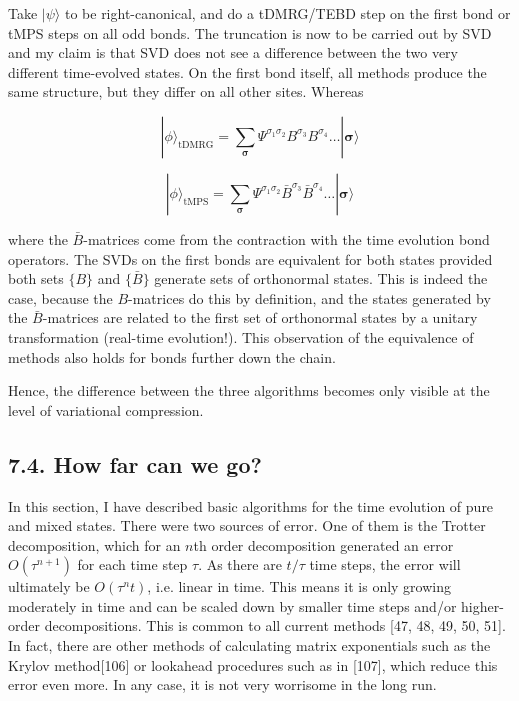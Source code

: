 \documentclass[12pt]{article}
\begin{document}
Take $|\psi\rangle$ to be right-canonical, and do a tDMRG/TEBD step on the first bond or tMPS steps on all odd bonds. The truncation is now to be carried out by SVD and my claim is that SVD does not see a difference between the two very different time-evolved states. On the first bond itself, all methods produce the same structure, but they differ on all other sites. Whereas


\begin{equation*}
|\phi\rangle_{\mathrm{tDMRG}}=\sum_{\boldsymbol{\sigma}} \Psi^{\sigma_{1} \sigma_{2}} B^{\sigma_{3}} B^{\sigma_{4}} \ldots|\boldsymbol{\sigma}\rangle \tag{275}
\end{equation*}



\begin{equation*}
|\phi\rangle_{\mathrm{tMPS}}=\sum_{\boldsymbol{\sigma}} \Psi^{\sigma_{1} \sigma_{2}} \bar{B}^{\sigma_{3}} \bar{B}^{\sigma_{4}} \ldots|\boldsymbol{\sigma}\rangle \tag{276}
\end{equation*}


where the $\bar{B}$-matrices come from the contraction with the time evolution bond operators. The SVDs on the first bonds are equivalent for both states provided both sets $\{B\}$ and $\{\bar{B}\}$ generate sets of orthonormal states. This is indeed the case, because the $B$-matrices do this by definition, and the states generated by the $\bar{B}$-matrices are related to the first set of orthonormal states by a unitary transformation (real-time evolution!). This observation of the equivalence of methods also holds for bonds further down the chain.

Hence, the difference between the three algorithms becomes only visible at the level of variational compression.

\subsection*{7.4. How far can we go?}
In this section, I have described basic algorithms for the time evolution of pure and mixed states. There were two sources of error. One of them is the Trotter decomposition, which for an $n$th order decomposition generated an error $O\left(\tau^{n+1}\right)$ for each time step $\tau$. As there are $t / \tau$ time steps, the error will ultimately be $O\left(\tau^{n} t\right)$, i.e. linear in time. This means it is only growing moderately in time and can be scaled down by smaller time steps and/or higher-order decompositions. This is common to all current methods [47, 48, 49, 50, 51]. In fact, there are other methods of calculating matrix exponentials such as the Krylov method[106] or lookahead procedures such as in [107], which reduce this error even more. In any case, it is not very worrisome in the long run.
\end{document}
